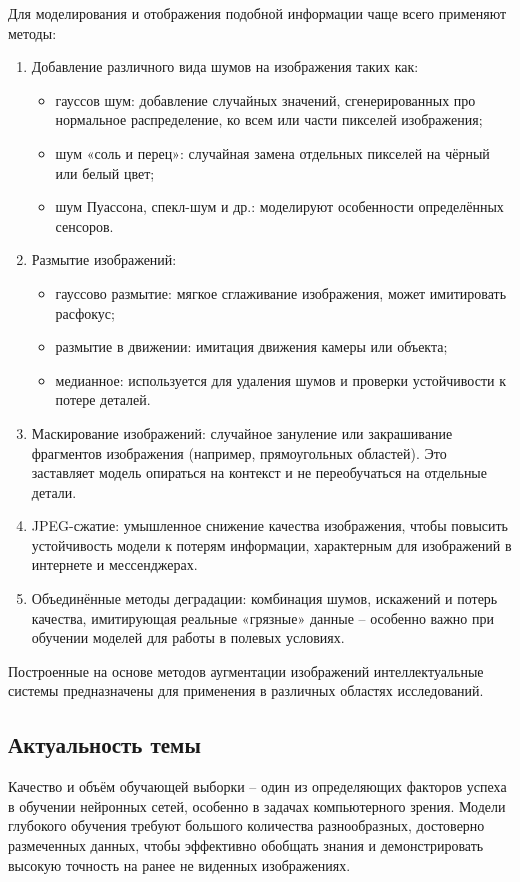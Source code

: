 Для моделирования и отображения подобной информации чаще всего применяют методы:

\begin{enumerate}
	\item Добавление различного вида шумов на изображения таких как:
	\begin{itemize}
	\item гауссов шум: добавление случайных значений, сгенерированных про нормальное распределение, ко всем или части пикселей изображения;
	\item шум «соль и перец»: случайная замена отдельных пикселей на чёрный или белый цвет;
	\item шум Пуассона, спекл-шум и др.: моделируют особенности определённых сенсоров.
	\end{itemize}
	\item Размытие изображений:
	\begin{itemize}
	\item гауссово размытие: мягкое сглаживание изображения, может имитировать расфокус;
	\item размытие в движении: имитация движения камеры или объекта;
	\item медианное: используется для удаления шумов и проверки устойчивости к потере деталей.
	\end{itemize}
	\item Маскирование изображений: случайное зануление или закрашивание фрагментов изображения (например, прямоугольных областей). Это заставляет модель опираться на контекст и не переобучаться на отдельные детали.
	\item JPEG-сжатие: умышленное снижение качества изображения, чтобы повысить устойчивость модели к потерям информации, характерным для изображений в интернете и мессенджерах.
	\item Объединённые методы деградации: комбинация шумов, искажений и потерь качества, имитирующая реальные «грязные» данные – особенно важно при обучении моделей для работы в полевых условиях.
\end{enumerate}

Построенные на основе методов аугментации изображений интеллектуальные системы предназначены для применения в различных областях исследований.

\subsection{Актуальность темы}

Качество и объём обучающей выборки – один из определяющих факторов успеха в обучении нейронных сетей, особенно в задачах компьютерного зрения. Модели глубокого обучения требуют большого количества разнообразных, достоверно размеченных данных, чтобы эффективно обобщать знания и демонстрировать высокую точность на ранее не виденных изображениях.


